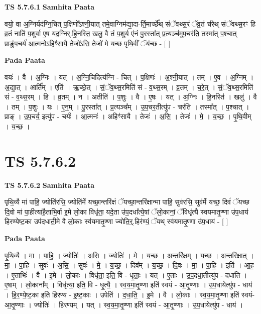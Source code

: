 \documentclass[17pt]{extarticle}
\begin{document}
\textbf{TS 5.7.6.1 } \newline
\textbf{Samhita Paata} \newline

वयो॒ वा अ॒ग्निर्यद॑ग्नि॒चित् प॒क्षिणो᳚ऽश्नी॒यात् तमे॒वाग्निम॑द्या॒दा-र्ति॒मार्च्छे᳚थ् संॅवथ्स॒रं ॅव्र॒तं च॑रेथ् संॅवथ्स॒रꣳ हि व्र॒तं नाति॑ प॒शुर्वा ए॒ष यद॒ग्निर्.हि॒नस्ति॒ खलु॒ वै तं प॒शुर्य ए॑नं पु॒रस्ता᳚त् प्र॒त्यञ्च॑मुप॒चर॑ति॒ तस्मा᳚त् प॒श्चात् प्राङु॑प॒चर्य॑ आ॒त्मनोऽहिꣳ॑सायै॒ तेजो॑ऽसि॒ तेजो॑ मे यच्छ पृथि॒वीं ॅय॑च्छ - [  ] \newline

\textbf{Pada Paata} \newline

वयः॑ । वै । अ॒ग्निः । यत् । अ॒ग्नि॒चिदित्य॑ग्नि - चित् । प॒क्षिणः॑ । अ॒श्नी॒यात् । तम् । ए॒व । अ॒ग्निम् । अ॒द्या॒त् । आर्ति᳚म् । एति॑ । ऋ॒च्छे॒त् । सं॒ॅव॒थ्स॒रमिति॑ सं - व॒थ्स॒रम् । व्र॒तम् । च॒रे॒त् । सं॒ॅव॒थ्स॒रमिति॑ सं - व॒थ्स॒रम् । हि । व्र॒तम् । न । अतीति॑ । प॒शुः । वै । ए॒षः । यत् । अ॒ग्निः । हि॒नस्ति॑ । खलु॑ । वै । तम् । प॒शुः । यः । ए॒न॒म् । पु॒रस्ता᳚त् । प्र॒त्यञ्च᳚म् । उ॒प॒चर॒तीत्यु॑प - चर॑ति । तस्मा᳚त् । प॒श्चात् । प्राङ् । उ॒प॒चर्य॒ इत्यु॑प - चर्यः॑ । आ॒त्मनः॑ । अहिꣳ॑सायै । तेजः॑ । अ॒सि॒ । तेजः॑ । मे॒ । य॒च्छ॒ । पृ॒थि॒वीम् । य॒च्छ॒ ।  \newline




\section*{ TS 5.7.6.2 }

\textbf{TS 5.7.6.2 } \newline
\textbf{Samhita Paata} \newline

पृथि॒व्यै मा॑ पाहि॒ ज्योति॑रसि॒ ज्योति॑र्मे यच्छा॒न्तरि॑क्षं ॅयच्छा॒न्तरि॑क्षान्मा पाहि॒ सुव॑रसि॒ सुव॑र्मे यच्छ॒ दिवं॑ ॅयच्छ दि॒वो मा॑ पा॒हीत्या॑है॒ताभि॒र्वा इ॒मे लो॒का विधृ॑ता॒ यदे॒ता उ॑प॒दधा᳚त्ये॒षां ॅलो॒कानां॒ ॅविधृ॑त्यै स्वयमातृ॒ण्णा उ॑प॒धाय॑ हिरण्येष्ट॒का उप॑दधाती॒मे वै लो॒काः स्व॑यमातृ॒ण्णा ज्योति॒र्॒.हिर॑ण्यं॒ ॅयथ् स्व॑यमातृ॒ण्णा उ॑प॒धाय॑ - [  ] \newline

\textbf{Pada Paata} \newline

पृ॒थि॒व्यै । मा॒ । पा॒हि॒ । ज्योतिः॑ । अ॒सि॒ । ज्योतिः॑ । मे॒ । य॒च्छ॒ । अ॒न्तरि॑क्षम् । य॒च्छ॒ । अ॒न्तरि॑क्षात् । मा॒ । पा॒हि॒ । सुवः॑ । अ॒सि॒ । सुवः॑ । मे॒ । य॒च्छ॒ । दिव᳚म् । य॒च्छ॒ । दि॒वः । मा॒ । पा॒हि॒ । इति॑ । आ॒ह॒ । ए॒ताभिः॑ । वै । इ॒मे । लो॒काः । विधृ॑ता॒ इति॒ वि - धृ॒ताः॒ । यत् । ए॒ताः । उ॒प॒दधा॒तीत्यु॑प - दधा॑ति । ए॒षाम् । लो॒काना᳚म् । विधृ॑त्या॒ इति॒ वि - धृ॒त्यै॒ । स्व॒य॒मा॒तृ॒ण्णा इति॑ स्वयं - आ॒तृ॒ण्णाः । उ॒प॒धायेत्यु॑प - धाय॑ । हि॒र॒ण्ये॒ष्ट॒का इति॑ हिरण्य - इ॒ष्ट॒काः । उपेति॑ । द॒धा॒ति॒ । इ॒मे । वै । लो॒काः । स्व॒य॒मा॒तृ॒ण्णा इति॑ स्वयं-आ॒तृ॒ण्णाः । ज्योतिः॑ । हिर॑ण्यम् । यत् । स्व॒य॒मा॒तृ॒ण्णा इति॑ स्वयं - आ॒तृ॒ण्णाः । उ॒प॒धायेत्यु॑प - धाय॑ ।  \newline
\end{document}
